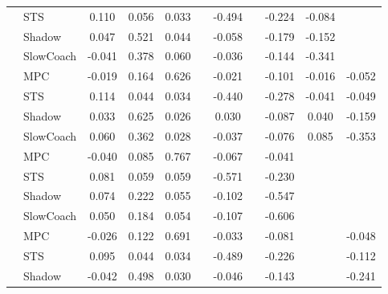 \begin{tabular}{|l|l|*{9}{c|}}
                                                           & STS &    0.110 &     0.056 &     0.033 &     & -0.494 &     &  -0.224 &  -0.084 &       \\
                                                           & Shadow &    0.047 &     0.521 &     0.044 &     & -0.058 &     &  -0.179 &  -0.152 &       \\
                                                           & SlowCoach &   -0.041 &     0.378 &     0.060 &     & -0.036 &     &  -0.144 &  -0.341 &       \\
\midrule
[True, True, True, False, True, False, True, True, True] & MPC &   -0.019 &     0.164 &     0.626 &     & -0.021 &     &  -0.101 &  -0.016 &   -0.052 \\
                                                           & STS &    0.114 &     0.044 &     0.034 &     & -0.440 &     &  -0.278 &  -0.041 &   -0.049 \\
                                                           & Shadow &    0.033 &     0.625 &     0.026 &     &  0.030 &     &  -0.087 &   0.040 &   -0.159 \\
                                                           & SlowCoach &    0.060 &     0.362 &     0.028 &     & -0.037 &     &  -0.076 &   0.085 &   -0.353 \\
\midrule
[True, True, True, False, True, False, True, False, False] & MPC &   -0.040 &     0.085 &     0.767 &     & -0.067 &     &  -0.041 &      &       \\
                                                           & STS &    0.081 &     0.059 &     0.059 &     & -0.571 &     &  -0.230 &      &       \\
                                                           & Shadow &    0.074 &     0.222 &     0.055 &     & -0.102 &     &  -0.547 &      &       \\
                                                           & SlowCoach &    0.050 &     0.184 &     0.054 &     & -0.107 &     &  -0.606 &      &       \\
\midrule
[True, True, True, False, True, False, True, False, True] & MPC &   -0.026 &     0.122 &     0.691 &     & -0.033 &     &  -0.081 &      &   -0.048 \\
                                                           & STS &    0.095 &     0.044 &     0.034 &     & -0.489 &     &  -0.226 &      &   -0.112 \\
                                                           & Shadow &   -0.042 &     0.498 &     0.030 &     & -0.046 &     &  -0.143 &      &   -0.241 \\

\end{tabular}
